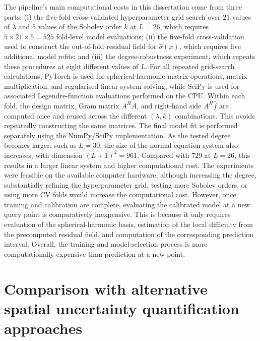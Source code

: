 \documentclass[11pt,a4paper]{report}
\begin{document}
The pipeline's main computational costs in this dissertation come from three parts: (i) the five-fold cross-validated hyperparameter grid search over $21$ values of $\lambda$ and $5$ values of the Sobolev order $k$ at $L=26$, which requires $5\times21\times5=525$ fold-level model evaluations; (ii) the five-fold cross-validation used to construct the out-of-fold residual field for $\hat\sigma(x)$, which requires five additional model refits; and (iii) the degree-robustness experiment, which repeats these procedures at eight different values of $L$. For all repeated grid-search calculations, PyTorch is used for spherical-harmonic matrix operations, matrix multiplication, and regularised linear-system solving, while SciPy is used for associated Legendre-function evaluations performed on the CPU. Within each fold, the design matrix, Gram matrix $A^HA$, and right-hand side $A^H\hat f$ are computed once and reused across the different $(\lambda,k)$ combinations. This avoids repeatedly constructing the same matrices. The final model fit is performed separately using the NumPy/SciPy implementation. As the tested degree becomes larger, such as $L=30$, the size of the normal-equation system also increases, with dimension $(L+1)^2=961$. Compared with $729$ at $L=26$, this results in a larger linear system and higher computational cost. The experiments were feasible on the available computer hardware, although increasing the degree, substantially refining the hyperparameter grid, testing more Sobolev orders, or using more CV folds would increase the computational cost. However, once training and calibration are complete, evaluating the calibrated model at a new query point is comparatively inexpensive. This is because it only requires evaluation of the spherical-harmonic basis, estimation of the local difficulty from the precomputed residual field, and computation of the corresponding prediction interval. Overall, the training and model-selection process is more computationally expensive than prediction at a new point.
 
\section{Comparison with alternative spatial uncertainty quantification approaches}
\end{document}
